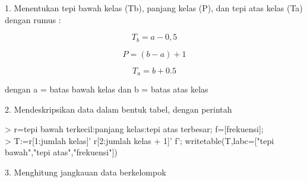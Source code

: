 \documentclass[a4paper,10pt]{article}
\begin{document}
\begin{eulernotebook}
\begin{eulercomment}
\begin{eulercomment}
\begin{eulercomment}
\begin{eulercomment}
\begin{eulercomment}
\begin{eulercomment}
\begin{eulercomment}
\begin{eulercomment}
\begin{eulercomment}
\begin{eulercomment}
\begin{eulercomment}
1. Menentukan tepi bawah kelas (Tb), panjang kelas (P), dan tepi atas
kelas (Ta) dengan rumus :

\end{eulercomment}
\begin{eulerformula}
\[
T_b=a-0,5
\]
\end{eulerformula}
\begin{eulerformula}
\[
P=(b-a)+1
\]
\end{eulerformula}
\begin{eulerformula}
\[
T_a=b+0.5
\]
\end{eulerformula}
\begin{eulercomment}
dengan a = batas bawah kelas dan b = batas atas kelas

2. Mendeskripsikan data dalam bentuk tabel, dengan perintah

\textgreater{} r=tepi bawah terkecil:panjang kelas:tepi atas terbesar;
f=[frekuensi];\\
\textgreater{} T:=r[1:jumlah kelas]' \textbar{} r[2:jumlah kelas + 1]' \textbar{} f';
writetable(T,labc=["tepi bawah","tepi atas","frekuensi"])

3. Menghitung jangkauan data berkelompok


\end{eulercomment}
\end{eulercomment}
\end{eulercomment}
\end{eulercomment}
\end{eulercomment}
\end{eulercomment}
\end{eulercomment}
\end{eulercomment}
\end{eulercomment}
\end{eulercomment}
\end{eulercomment}
\end{eulernotebook}
\end{document}
